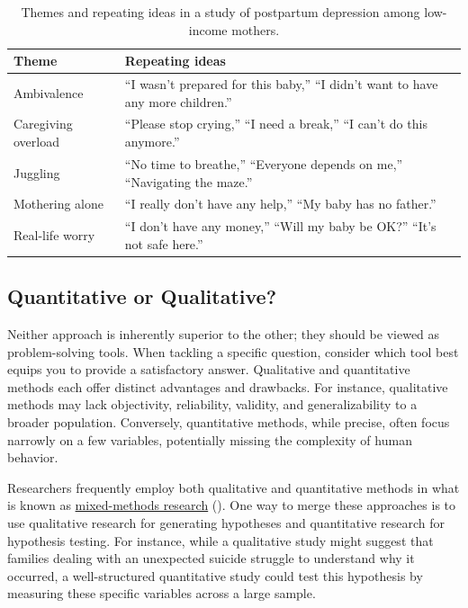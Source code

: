 \documentclass[
]{krantz}
\begin{document}
\begin{table}

\caption{\label{tab:themes}Themes and repeating ideas in a study of postpartum depression among low-income mothers.}
\centering
\begin{tabular}[t]{l|l}
\hline
Theme & Repeating ideas\\
\hline
Ambivalence & “I wasn’t prepared for this baby,” “I didn’t want to have any more children.”\\
\hline
Caregiving overload & “Please stop crying,” “I need a break,” “I can’t do this anymore.”\\
\hline
Juggling & “No time to breathe,” “Everyone depends on me,” “Navigating the maze.”\\
\hline
Mothering alone & “I really don’t have any help,” “My baby has no father.”\\
\hline
Real-life worry & “I don’t have any money,” “Will my baby be OK?” “It’s not safe here.”\\
\hline
\end{tabular}
\end{table}

\subsection*{Quantitative or Qualitative?}\label{quantitative-or-qualitative}


Neither approach is inherently superior to the other; they should be viewed as problem-solving tools. When tackling a specific question, consider which tool best equips you to provide a satisfactory answer. Qualitative and quantitative methods each offer distinct advantages and drawbacks. For instance, qualitative methods may lack objectivity, reliability, validity, and generalizability to a broader population. Conversely, quantitative methods, while precise, often focus narrowly on a few variables, potentially missing the complexity of human behavior.

Researchers frequently employ both qualitative and quantitative methods in what is known as \hyperref[mixed-methods-research]{mixed-methods research} (). One way to merge these approaches is to use qualitative research for generating hypotheses and quantitative research for hypothesis testing. For instance, while a qualitative study might suggest that families dealing with an unexpected suicide struggle to understand why it occurred, a well-structured quantitative study could test this hypothesis by measuring these specific variables across a large sample.
\end{document}
